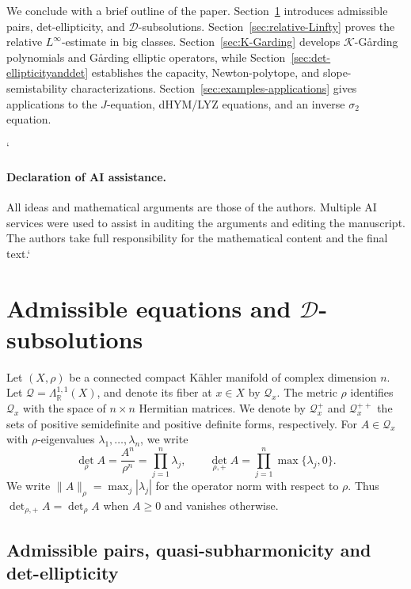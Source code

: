 \documentclass[oneside,english,letterpaper]{amsart}
\numberwithin{equation}{section}
\theoremstyle{plain}
\theoremstyle{definition}
\theoremstyle{remark}
\begin{document}
We conclude with a brief outline of the paper.
Section~\ref{sec:admissible-equations} introduces admissible pairs, det-ellipticity, and
$\mathcal D$-subsolutions. Section~\ref{sec:relative-Linfty} proves the relative $L^\infty$-estimate in big
classes. Section~\ref{sec:K-Garding} develops $\mathcal K$-G{\aa}rding polynomials and
G{\aa}rding elliptic operators, while Section~\ref{sec:det-ellipticityanddet} establishes the
capacity, Newton-polytope, and slope-semistability characterizations.
Section~\ref{sec:examples-applications} gives applications to the $J$-equation, dHYM/LYZ equations, and an inverse $\sigma_2$ equation.


`\paragraph{\textbf{Declaration of AI assistance.}}
All ideas and mathematical arguments are those of the authors.
Multiple AI services were used to assist in auditing the arguments
and editing the manuscript. The authors take full responsibility
for the mathematical content and the final text.`

\section{Admissible equations and \texorpdfstring{$\mathcal D$}{D}-subsolutions}
\label{sec:admissible-equations}

Let $(X,\rho)$ be a connected compact K\"ahler manifold of complex
dimension $n$. Let $\mathcal Q=\Lambda_{\mathbb R}^{1,1}(X)$, and
denote its fiber at $x\in X$ by $\mathcal Q_x$. The metric $\rho$
identifies $\mathcal Q_x$ with the space of $n\times n$ Hermitian
matrices. We denote by $\mathcal Q_x^+$ and $\mathcal Q_x^{++}$ the
sets of positive semidefinite and positive definite forms,
respectively. For $A\in\mathcal Q_x$ with $\rho$-eigenvalues
$\lambda_1,\ldots,\lambda_n$, we write
$$
\det_\rho A=\frac{A^n}{\rho^n}=\prod_{j=1}^n\lambda_j,
\qquad
\det_{\rho,+}A=\prod_{j=1}^n\max\{\lambda_j,0\}.
$$
We write $\|A\|_\rho=\max_j|\lambda_j|$ for the operator norm with
respect to $\rho$. Thus $\det_{\rho,+}A=\det_\rho A$ when $A\geq0$
and vanishes otherwise.

\subsection{Admissible pairs, quasi-subharmonicity and det-ellipticity}
\label{subsec:det-ellipticity}
\end{document}
